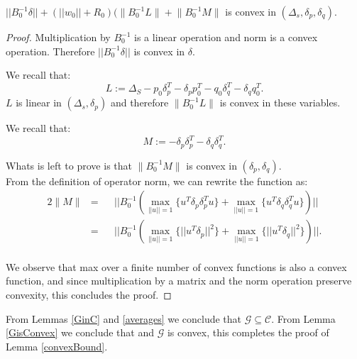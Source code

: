 \documentclass{vldb}
\begin{document}
\begin{appendix}
\begin{lemma} \label{GisConvex}
$||B_0^{-1}\delta|| + (||w_0||+R_0)(\Big \|B_0^{-1}L\Big \|+\Big \|B_0^{-1}M\Big \|$ is convex in $(\Delta_s,\delta_p, \delta_q).$
\end{lemma}
\begin{proof}
Multiplication by $B_0^{-1}$ is a linear operation and norm is a convex
operation. Therefore $||B_0^{-1}\delta||$ is convex in $\delta$.

We recall that:
\begin{equation*}
L:= \Delta_S - p_0\delta_p^T - \delta_pp_0^T - q_0\delta_q^T - \delta_qq_0^T.
\end{equation*}
$L$ is linear in $(\Delta_s, \delta_p)$ and therefore $\Big \|B_0^{-1}L\Big \|$ is convex in these variables.


We recall that:
\begin{equation*}
M:= - \delta_p\delta_p^T - \delta_q\delta_q^T.
\end{equation*}

Whats is left to prove is that $\Big \|B_0^{-1}M\Big \|$ is convex in $(\delta_p, \delta_q)$.
\\From the definition of operator norm, we can rewrite the function as:
\begin{alignat*} {2}
\Big \|M \Big \| & = && ||B_0^{-1}(\max_{||u||=1}{\{u^T \delta_p\delta_p^T u\}} +
\max_{||u||=1}{\{u^T \delta_q\delta_q^T u\}})||\\
& = && ||B_0^{-1}(\max_{||u||=1}{\{||u^T \delta_p||^2\}} +
\max_{||u||=1}{\{||u^T \delta_q||^2\}})||.
\end{alignat*}
\\We observe that max over a finite number of convex functions is also a convex
function, and since multiplication by a matrix and the norm
operation preserve convexity, this concludes the proof.
\end{proof}

\begin{corollary}
From Lemmas \ref{GinC} and \ref{averages} we conclude that $\mathcal{G}\subseteq \mathcal{C}$. From Lemma \ref{GisConvex} we conclude that and $\mathcal{G}$ is convex, this completes the proof of Lemma \ref{convexBound}.
\end{corollary}
\end{appendix}
\end{document}
